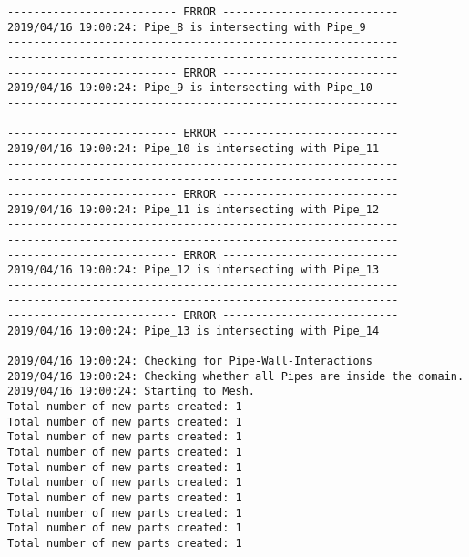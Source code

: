 \documentclass{article}
\begin{document}
{\begin{verbatim}
-------------------------- ERROR ---------------------------
2019/04/16 19:00:24: Pipe_8 is intersecting with Pipe_9
------------------------------------------------------------
------------------------------------------------------------
-------------------------- ERROR ---------------------------
2019/04/16 19:00:24: Pipe_9 is intersecting with Pipe_10
------------------------------------------------------------
------------------------------------------------------------
-------------------------- ERROR ---------------------------
2019/04/16 19:00:24: Pipe_10 is intersecting with Pipe_11
------------------------------------------------------------
------------------------------------------------------------
-------------------------- ERROR ---------------------------
2019/04/16 19:00:24: Pipe_11 is intersecting with Pipe_12
------------------------------------------------------------
------------------------------------------------------------
-------------------------- ERROR ---------------------------
2019/04/16 19:00:24: Pipe_12 is intersecting with Pipe_13
------------------------------------------------------------
------------------------------------------------------------
-------------------------- ERROR ---------------------------
2019/04/16 19:00:24: Pipe_13 is intersecting with Pipe_14
------------------------------------------------------------
2019/04/16 19:00:24: Checking for Pipe-Wall-Interactions
2019/04/16 19:00:24: Checking whether all Pipes are inside the domain.
2019/04/16 19:00:24: Starting to Mesh.
Total number of new parts created: 1
Total number of new parts created: 1
Total number of new parts created: 1
Total number of new parts created: 1
Total number of new parts created: 1
Total number of new parts created: 1
Total number of new parts created: 1
Total number of new parts created: 1
Total number of new parts created: 1
Total number of new parts created: 1
\end{verbatim}
}
\clearpage
\end{document}
